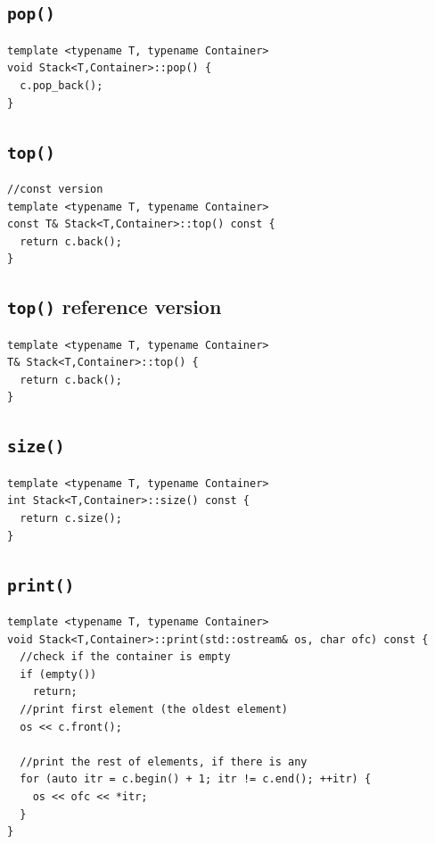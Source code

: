 \documentclass[12pt]{book}
\begin{document}
\subsection{\texttt{pop()}}
\label{sec:org813c397}
\begin{verbatim}
template <typename T, typename Container>
void Stack<T,Container>::pop() {
  c.pop_back();
}
\end{verbatim}
\subsection{\texttt{top()}}
\label{sec:org65331bd}
\begin{verbatim}
//const version 
template <typename T, typename Container>
const T& Stack<T,Container>::top() const {
  return c.back();
}
\end{verbatim}
\subsection{\texttt{top()} reference version}
\label{sec:org09a1bb2}
\begin{verbatim}
template <typename T, typename Container>
T& Stack<T,Container>::top() {
  return c.back();
}
\end{verbatim}
\subsection{\texttt{size()}}
\label{sec:org6a5ba27}
\begin{verbatim}
template <typename T, typename Container>
int Stack<T,Container>::size() const {
  return c.size();
}
\end{verbatim}
\subsection{\texttt{print()}}
\label{sec:orgfcba48c}
\begin{verbatim}
template <typename T, typename Container>
void Stack<T,Container>::print(std::ostream& os, char ofc) const {
  //check if the container is empty
  if (empty())
    return;
  //print first element (the oldest element)
  os << c.front();

  //print the rest of elements, if there is any
  for (auto itr = c.begin() + 1; itr != c.end(); ++itr) {
    os << ofc << *itr;
  } 
}
\end{verbatim}
\end{document}
